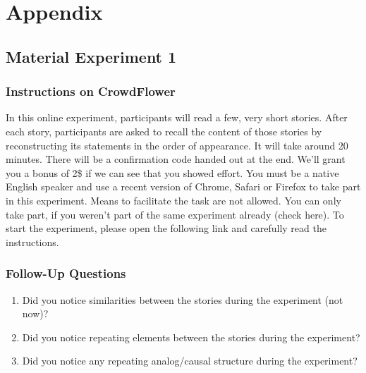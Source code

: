 \section{Appendix}
\subsection{Material Experiment 1}
\subsubsection{Instructions on CrowdFlower}
In this online experiment, participants will read a few, very short stories. After each story, participants are asked to recall the content of those stories by reconstructing its statements in the order of appearance.
It will take around 20 minutes. There will be a confirmation code handed out at the end. We'll grant you a bonus of 2\$ if we can see that you showed effort. You must be a native English speaker and use a recent version of Chrome, Safari or Firefox to take part in this experiment. Means to facilitate the task are not allowed. You can only take part, if you weren't part of the same experiment already (check here).
To start the experiment, please open the following link and carefully read the instructions.

\subsubsection{Follow-Up Questions}
\begin{enumerate}
  \item Did you notice similarities between the stories during the experiment (not now)?
  \item Did you notice repeating elements between the stories during the experiment?
  \item Did you notice any repeating analog/causal structure during the experiment?
\end{enumerate}

